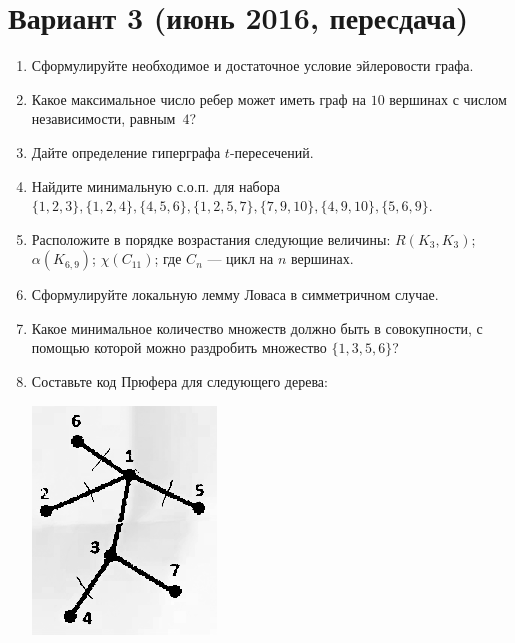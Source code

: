 \documentclass[oneside]{book}
\begin{document}
\section{Вариант 3 (июнь 2016, пересдача)}
\begin{enumerate}
\item Сформулируйте необходимое и достаточное условие эйлеровости графа.
\item Какое максимальное число ребер может иметь граф на $10$ вершинах с числом независимости, равным~$4$?
\item Дайте определение гиперграфа $t$-пересечений.
\item Найдите минимальную с.о.п. для набора $\{1,2,3\}, \{1,2,4\},\{4,5,6\},\{1,2,5,7\},\{7,9,10\},\{4,9,10\},\{5,6,9\}$.
\item Расположите в порядке возрастания следующие величины: $R(K_3, K_3)$; $\alpha(K_{6,9})$; $\chi(C_{11})$; где $C_n$ --- цикл на $n$ вершинах.
\item Сформулируйте локальную лемму Ловаса в симметричном случае.
\item Какое минимальное количество множеств должно быть в совокупности, с помощью которой можно раздробить  множество  $\{1,3,5,6\}$?
\item Составьте код Прюфера для следующего дерева:
\begin{center}
\includegraphics[width=0.13\linewidth]{./1}
\end{center}
\end{enumerate}
\end{document}
